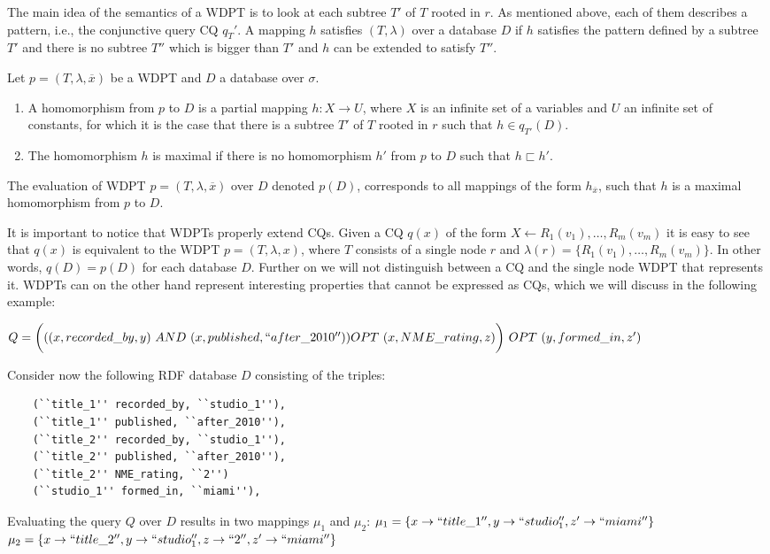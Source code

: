 The main idea of the semantics of a WDPT is to look at each subtree $T'$ of
$T$ rooted in $r$. As mentioned above, each of them describes a pattern, i.e.,
the conjunctive query CQ $q_T'$. A mapping $h$ satisfies $(T,\lambda)$ over
a database $D$ if $h$ satisfies the pattern defined by a subtree $T'$ and there
is no subtree $T''$ which is bigger than $T'$ and $h$ can be extended to satisfy
$T''$.
\begin{definition}
	Let $p=(T,\lambda,\overline{x})$ be a WDPT and $D$ a database over $\sigma$.

	\begin{enumerate}
		\item A homomorphism from $p$ to $D$ is a partial mapping $h: X \rightarrow U$,
			where $X$ is an infinite set of a variables and $U$ an infinite set of
			constants, for which it is the case that there is a subtree $T'$ of $T$ rooted
			in $r$ such that $h \in q_{T'}(D)$.
		\item The homomorphism $h$ is maximal if there is no homomorphism $h'$ from $p$
			to $D$ such that $h \sqsubset h'$.
	\end{enumerate}
	The evaluation of WDPT $p = (T,\lambda,\overline{x})$ over $D$ denoted $p(D)$,
	corresponds to all mappings of the form $h_{\overline{x}}$, such that $h$ is a
	maximal homomorphism from $p$ to $D$.
\end{definition}

It is important to notice that WDPTs properly extend CQs.
Given a CQ $q(x)$ of the form $X \leftarrow R_1(v_1),\dots,R_m(v_m)$
it is easy to see that $q(x)$ is equivalent to the WDPT $p = (T,\lambda,x)$,
where $T$ consists of a single node $r$ and $\lambda(r) =
\{R_1(v_1),\dots,R_m(v_m)\}$. In other words, $q(D) = p(D)$ for each database
$D$. Further on we will not distinguish between a CQ and the single node WDPT
that represents it. WDPTs can on the other hand represent interesting properties
that cannot be expressed as CQs, which we will discuss in the following example:
\begin{example}
	$Q =  \bigg(((x,recorded\_by,y) \ AND \ (x,published, ``after\_2010'')) \ \\ OPT \ (x,
	NME\_rating,z)\bigg) \ OPT \ (y, formed\_in, z') $

	\noindent Consider now the following RDF database $D$ consisting of the triples:
	\begin{verbatim}
	(``title_1'' recorded_by, ``studio_1''),
	(``title_1'' published, ``after_2010''),
	(``title_2'' recorded_by, ``studio_1''),
	(``title_2'' published, ``after_2010''),
	(``title_2'' NME_rating, ``2'')
	(``studio_1'' formed_in, ``miami''),
	\end{verbatim}
	Evaluating the query $Q$ over $D$ results in two mappings $\mu_1$ and $\mu_2$:
	$\mu_1 = \{ x \rightarrow ``title\_1'', y \rightarrow ``studio_1'',z'
	\rightarrow ``miami'' \}$ 
	$\mu_2 = \{ x \rightarrow ``title\_2'', y \rightarrow ``studio_1'',z\rightarrow
	``2'', z' \rightarrow ``miami'' \}$ 
\end{example}


